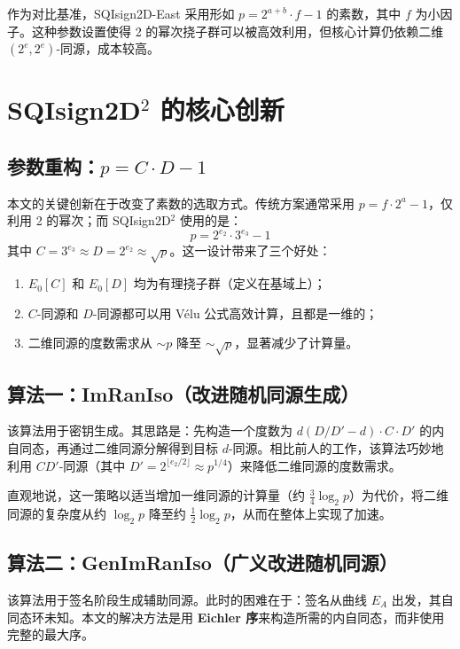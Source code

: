 \documentclass[12pt,a4paper]{ctexart}
\theoremstyle{remark}
\begin{document}
作为对比基准，SQIsign2D-East 采用形如 $p = 2^{a+b} \cdot f - 1$ 的素数，其中 $f$ 为小因子。这种参数设置使得 2 的幂次挠子群可以被高效利用，但核心计算仍依赖二维 $(2^e, 2^e)$-同源，成本较高。

\section{SQIsign2D$^2$ 的核心创新}

\subsection{参数重构：$p = C \cdot D - 1$}

本文的关键创新在于改变了素数的选取方式。传统方案通常采用 $p = f \cdot 2^a - 1$，仅利用 2 的幂次；而 SQIsign2D$^2$ 使用的是：
\begin{equation}
p = 2^{e_2} \cdot 3^{e_3} - 1
\end{equation}
其中 $C = 3^{e_3} \approx D = 2^{e_2} \approx \sqrt{p}$。这一设计带来了三个好处：
\begin{enumerate}
  \item $E_0[C]$ 和 $E_0[D]$ 均为有理挠子群（定义在基域上）；
  \item $C$-同源和 $D$-同源都可以用 V\'{e}lu 公式高效计算，且都是一维的；
  \item 二维同源的度数需求从 $\sim p$ 降至 $\sim \sqrt{p}$，显著减少了计算量。
\end{enumerate}

\subsection{算法一：ImRanIso（改进随机同源生成）}

该算法用于密钥生成。其思路是：先构造一个度数为 $d(D/D' - d) \cdot C \cdot D'$ 的内自同态，再通过二维同源分解得到目标 $d$-同源。相比前人的工作，该算法巧妙地利用 $CD'$-同源（其中 $D' = 2^{\lfloor e_2/2 \rfloor} \approx p^{1/4}$）来降低二维同源的度数需求。

直观地说，这一策略以适当增加一维同源的计算量（约 $\frac{3}{4} \log_2 p$）为代价，将二维同源的复杂度从约 $\log_2 p$ 降至约 $\frac{1}{2} \log_2 p$，从而在整体上实现了加速。

\subsection{算法二：GenImRanIso（广义改进随机同源）}

该算法用于签名阶段生成辅助同源。此时的困难在于：签名从曲线 $E_A$ 出发，其自同态环未知。本文的解决方法是用 \textbf{Eichler 序}来构造所需的内自同态，而非使用完整的最大序。
\end{document}
